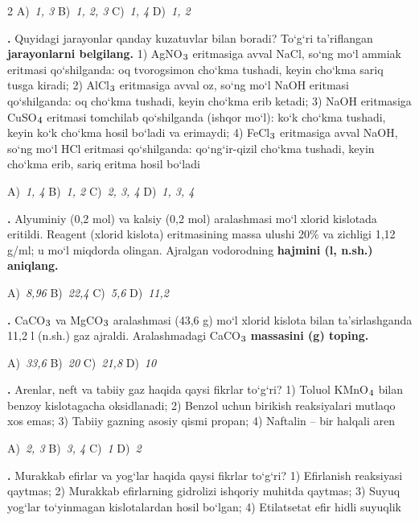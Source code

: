 \documentclass[11pt,a4paper]{article}
\renewcommand{\textsubscript}[1]{\ensuremath{_{\text{\fontsize{8}{8}\selectfont #1}}}}
\newcommand{\qn}[1]{\textbf{\fontsize{11.5}{13}\selectfont #1}}
\newcommand{\qsep}{\par\vspace{13pt}}
\begin{document}
\begin{multicols}{2}
\noindent A)~\textsl{1, 3} \hfill B)~\textsl{1, 2, 3} \hfill C)~\textsl{1, 4} \hfill D)~\textsl{1, 2}\par
\qsep
\noindent\qn{17.} Quyidagi jarayonlar qanday kuzatuvlar bilan boradi? To`g`ri ta'riflangan \textbf{jarayonlarni belgilang.} 1) AgNO\textsubscript{3} eritmasiga avval NaCl, so`ng mo`l ammiak eritmasi qo`shilganda: oq tvorogsimon cho`kma tushadi, keyin cho`kma sariq tusga kiradi; 2) AlCl\textsubscript{3} eritmasiga avval oz, so`ng mo`l NaOH eritmasi qo`shilganda: oq cho`kma tushadi, keyin cho`kma erib ketadi; 3) NaOH eritmasiga CuSO\textsubscript{4} eritmasi tomchilab qo`shilganda (ishqor mo`l): ko`k cho`kma tushadi, keyin ko`k cho`kma hosil bo`ladi va erimaydi; 4) FeCl\textsubscript{3} eritmasiga avval NaOH, so`ng mo`l HCl eritmasi qo`shilganda: qo`ng`ir-qizil cho`kma tushadi, keyin cho`kma erib, sariq eritma hosil bo`ladi

\noindent A)~\textsl{1, 4} \hfill B)~\textsl{1, 2} \hfill C)~\textsl{2, 3, 4} \hfill D)~\textsl{1, 3, 4}\par
\qsep
\noindent\qn{18.} Alyuminiy (0,2 mol) va kalsiy (0,2 mol) aralashmasi mo`l xlorid kislotada eritildi. Reagent (xlorid kislota) eritmasining massa ulushi 20\% va zichligi 1,12 g/ml; u mo`l miqdorda olingan. Ajralgan vodorodning \textbf{hajmini (l, n.sh.) aniqlang.}

\noindent A)~\textsl{8,96} \hfill B)~\textsl{22,4} \hfill C)~\textsl{5,6} \hfill D)~\textsl{11,2}\par
\qsep
\noindent\qn{19.} CaCO\textsubscript{3} va MgCO\textsubscript{3} aralashmasi (43,6 g) mo`l xlorid kislota bilan ta'sirlashganda 11,2 l (n.sh.) gaz ajraldi. Aralashmadagi CaCO\textsubscript{3} \textbf{massasini (g) toping.}

\noindent A)~\textsl{33,6} \hfill B)~\textsl{20} \hfill C)~\textsl{21,8} \hfill D)~\textsl{10}\par
\qsep
\noindent\qn{20.} Arenlar, neft va tabiiy gaz haqida qaysi fikrlar to`g`ri? 1) Toluol KMnO\textsubscript{4} bilan benzoy kislotagacha oksidlanadi; 2) Benzol uchun birikish reaksiyalari mutlaqo xos emas; 3) Tabiiy gazning asosiy qismi propan; 4) Naftalin -- bir halqali aren

\noindent A)~\textsl{2, 3} \hfill B)~\textsl{3, 4} \hfill C)~\textsl{1} \hfill D)~\textsl{2}\par
\qsep
\noindent\qn{21.} Murakkab efirlar va yog`lar haqida qaysi fikrlar to`g`ri? 1) Efirlanish reaksiyasi qaytmas; 2) Murakkab efirlarning gidrolizi ishqoriy muhitda qaytmas; 3) Suyuq yog`lar to`yinmagan kislotalardan hosil bo`lgan; 4) Etilatsetat efir hidli suyuqlik


\end{multicols}
\end{document}
